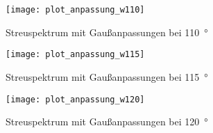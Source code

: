 \documentclass[11pt, ngerman, fleqn, DIV=15, headinclude, BCOR=2cm]{scrreprt}
\begin{document}
\begin{appendix}
\begin{figure}[h]
    \centering
    \texttt{[image: plot\_anpassung\_w110]}
    \caption{%
	    Streuspektrum mit Gaußanpassungen bei \SI{110}{\degree}
    }
    \label{fig:plot_anpassung_w110}
\end{figure}

\begin{figure}[h]
    \centering
    \texttt{[image: plot\_anpassung\_w115]}
    \caption{%
	    Streuspektrum mit Gaußanpassungen bei \SI{115}{\degree}
    }
    \label{fig:plot_anpassung_w115}
\end{figure}

\begin{figure}[h]
    \centering
    \texttt{[image: plot\_anpassung\_w120]}
    \caption{%
	    Streuspektrum mit Gaußanpassungen bei \SI{120}{\degree}
    }
    \label{fig:plot_anpassung_w120}
\end{figure}

\clearpage



\end{appendix}
\end{document}
